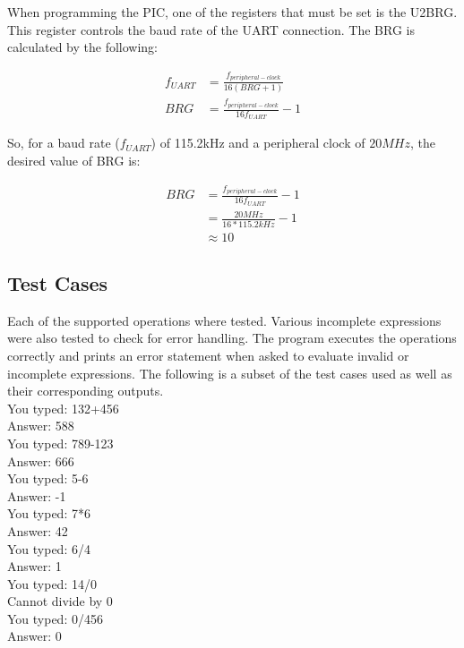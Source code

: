 \documentclass[11pt]{article}
\begin{document}
When programming the PIC, one of the registers that must be set is the U2BRG. This register controls the baud rate of the UART connection. The BRG is calculated by the following:

\begin{align*}
f_{UART} &= \frac{f_{peripheral-clock}}{16(BRG+1)} \\
BRG &= \frac{f_{peripheral-clock}}{16f_{UART}}-1
\end{align*}

So, for a baud rate ($f_{UART}$) of 115.2kHz and a peripheral clock of $20MHz$, the desired value of BRG is:

\begin{align*}
BRG &= \frac{f_{peripheral-clock}}{16f_{UART}}-1 \\
	&= \frac{20MHz}{16*115.2kHz}-1 \\
	& \approx 10
\end{align*}

\subsection{Test Cases}
Each of the supported operations where tested. Various incomplete expressions were also tested to check for error handling. The program executes the operations correctly and prints an error statement when asked to evaluate invalid or incomplete expressions. The following is a subset of the test cases used as well as their corresponding outputs. \\

You typed: 132+456 \\
Answer: 588 \\

You typed: 789-123 \\
Answer: 666 \\

You typed: 5-6 \\
Answer: -1 \\

You typed: 7*6 \\
Answer: 42 \\

You typed: 6/4 \\
Answer: 1 \\

You typed: 14/0 \\
Cannot divide by 0 \\

You typed: 0/456 \\
Answer: 0 \\
\end{document}
